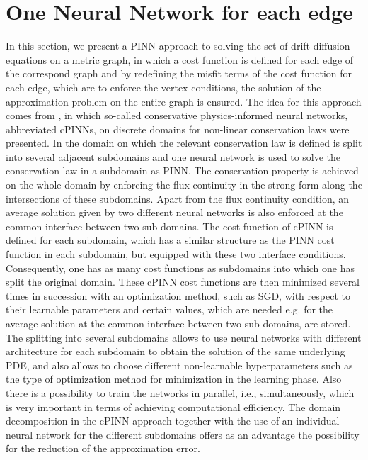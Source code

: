 \section{One Neural Network for each edge}
\label{ch3:sec2}

In this section, we present a PINN approach to solving the set of drift-diffusion equations on a metric graph, in which a cost function is defined for each edge of the correspond graph and by redefining the misfit terms of the cost function for each edge, which are to enforce the vertex conditions, the solution of the approximation problem on the entire graph is ensured. The idea for this approach comes from \cite{JagtapKharazmiKarniadakis:2020}, in which so-called conservative physics-informed neural networks, abbreviated cPINNs, on discrete domains for non-linear conservation laws were presented. In \cite{JagtapKharazmiKarniadakis:2020} the domain on which the relevant conservation law is defined is split into several adjacent subdomains and one neural network is used to solve the conservation law in a subdomain as PINN. The conservation property is achieved on the whole domain by enforcing the flux continuity in the strong form along the intersections of these subdomains. Apart from the flux continuity condition, an average solution given by two different neural networks is also enforced at the common interface between two sub-domains. The cost function of cPINN is defined for each subdomain, which has a similar structure as the PINN cost function in each subdomain, but equipped with these two interface conditions. Consequently, one has as many cost functions as subdomains into which one has split the original domain. These cPINN cost functions are then minimized several times in succession with an optimization method, such as SGD, with respect to their learnable parameters and certain values, which are needed e.g. for the average solution at the common interface between two sub-domains, are stored. The splitting into several subdomains allows to use neural networks with different architecture for each subdomain to obtain the solution of the same underlying PDE, and also allows to choose different non-learnable hyperparameters such as the type of optimization method for minimization in the learning phase. Also there is a possibility to train the networks in parallel, i.e., simultaneously, which is very important in terms of achieving computational efficiency. The domain decomposition in the cPINN approach together with the use of an individual neural network for the different subdomains offers as an advantage the possibility for the reduction of the approximation error.




